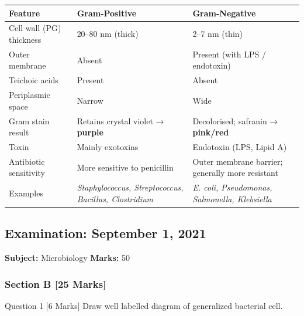 \documentclass[11pt,a4paper]{article}
\begin{document}
\begin{ansbox}
\begin{center}
\begin{tabular}{p{3.5cm}p{5cm}p{5cm}}
\toprule
\textbf{Feature} & \textbf{Gram-Positive} & \textbf{Gram-Negative} \\
\midrule
Cell wall (PG) thickness & 20--80 nm (thick) & 2--7 nm (thin) \\
Outer membrane & Absent & Present (with LPS / endotoxin) \\
Teichoic acids & Present & Absent \\
Periplasmic space & Narrow & Wide \\
Gram stain result & Retains crystal violet → \textbf{purple} & Decolorised; safranin → \textbf{pink/red} \\
Toxin & Mainly exotoxins & Endotoxin (LPS, Lipid A) \\
Antibiotic sensitivity & More sensitive to penicillin & Outer membrane barrier; generally more resistant \\
Examples & \textit{Staphylococcus, Streptococcus, Bacillus, Clostridium} & \textit{E. coli, Pseudomonas, Salmonella, Klebsiella} \\
\bottomrule
\end{tabular}
\end{center}
\end{ansbox}

\subsection{Examination: September 1, 2021}
\textbf{Subject:} Microbiology \quad \textbf{Marks:} 50

\subsubsection{Section B [25 Marks]}

\begin{qbox}{Question 1 [6 Marks]}
Draw well labelled diagram of generalized bacterial cell.
\end{qbox}
\end{document}
